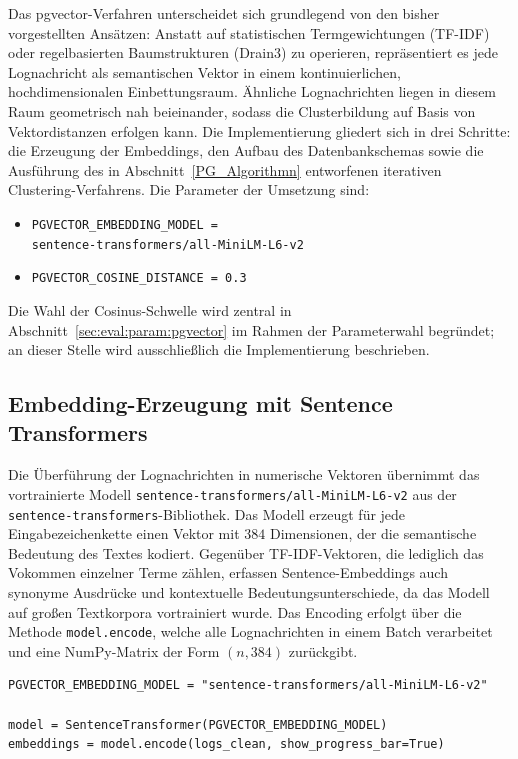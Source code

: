 Das pgvector-Verfahren unterscheidet sich grundlegend von den bisher vorgestellten
Ansätzen: Anstatt auf statistischen Termgewichtungen (TF-IDF) oder regelbasierten
Baumstrukturen (Drain3) zu operieren, repräsentiert es jede Lognachricht als
semantischen Vektor in einem kontinuierlichen, hochdimensionalen Einbettungsraum.
Ähnliche Lognachrichten liegen in diesem Raum geometrisch nah beieinander, sodass
die Clusterbildung auf Basis von Vektordistanzen erfolgen kann. Die Implementierung
gliedert sich in drei Schritte: die Erzeugung der Embeddings, den Aufbau des
Datenbankschemas sowie die Ausführung des in Abschnitt~\ref{PG_Algorithmn}
entworfenen iterativen Clustering-Verfahrens. Die Parameter der Umsetzung sind:

\begin{itemize}
    \item \texttt{PGVECTOR\_EMBEDDING\_MODEL = \\ sentence-transformers/all-MiniLM-L6-v2}
    \item \texttt{PGVECTOR\_COSINE\_DISTANCE = 0.3}
\end{itemize}

Die Wahl der Cosinus-Schwelle wird zentral in
Abschnitt~\ref{sec:eval:param:pgvector} im Rahmen der Parameterwahl
begründet; an dieser Stelle wird ausschließlich die Implementierung
beschrieben.

\subsection{Embedding-Erzeugung mit Sentence Transformers}

Die Überführung der Lognachrichten in numerische Vektoren übernimmt das
vortrainierte Modell \texttt{sentence-transformers/all-MiniLM-L6-v2} aus der \\
\texttt{sentence-transformers}-Bibliothek. Das Modell erzeugt für jede
Eingabezeichenkette einen Vektor mit $384$ Dimensionen, der die semantische
Bedeutung des Textes kodiert. Gegenüber TF-IDF-Vektoren, die lediglich das
Vokommen einzelner Terme zählen, erfassen Sentence-Embeddings auch synonyme
Ausdrücke und kontextuelle Bedeutungsunterschiede, da das Modell auf großen
Textkorpora vortrainiert wurde. Das Encoding erfolgt über die Methode
\lstinline{model.encode}, welche alle Lognachrichten in einem Batch verarbeitet
und eine NumPy-Matrix der Form $(n, 384)$ zurückgibt.

\begin{lstlisting}[caption={Embedding-Erzeugung mit all-MiniLM-L6-v2},
                   label={lst:pgvector-embed}]
PGVECTOR_EMBEDDING_MODEL = "sentence-transformers/all-MiniLM-L6-v2"

model = SentenceTransformer(PGVECTOR_EMBEDDING_MODEL)
embeddings = model.encode(logs_clean, show_progress_bar=True)
\end{lstlisting}


